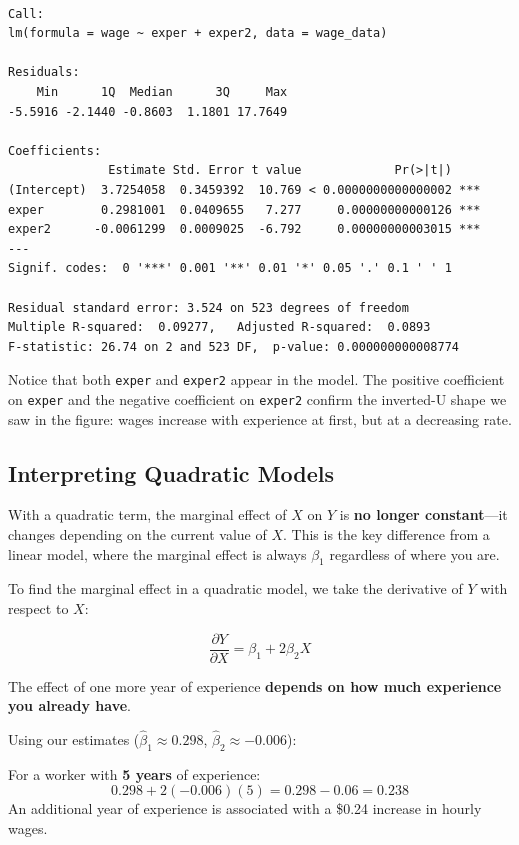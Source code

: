 \documentclass[
  letterpaper,
  DIV=11,
  numbers=noendperiod]{scrreprt}
\begin{document}
\begin{verbatim}

Call:
lm(formula = wage ~ exper + exper2, data = wage_data)

Residuals:
    Min      1Q  Median      3Q     Max 
-5.5916 -2.1440 -0.8603  1.1801 17.7649 

Coefficients:
              Estimate Std. Error t value             Pr(>|t|)    
(Intercept)  3.7254058  0.3459392  10.769 < 0.0000000000000002 ***
exper        0.2981001  0.0409655   7.277     0.00000000000126 ***
exper2      -0.0061299  0.0009025  -6.792     0.00000000003015 ***
---
Signif. codes:  0 '***' 0.001 '**' 0.01 '*' 0.05 '.' 0.1 ' ' 1

Residual standard error: 3.524 on 523 degrees of freedom
Multiple R-squared:  0.09277,   Adjusted R-squared:  0.0893 
F-statistic: 26.74 on 2 and 523 DF,  p-value: 0.000000000008774
\end{verbatim}

Notice that both \texttt{exper} and \texttt{exper2} appear in the model.
The positive coefficient on \texttt{exper} and the negative coefficient
on \texttt{exper2} confirm the inverted-U shape we saw in the figure:
wages increase with experience at first, but at a decreasing rate.

\subsection{Interpreting Quadratic
Models}\label{interpreting-quadratic-models}

With a quadratic term, the marginal effect of \(X\) on \(Y\) is
\textbf{no longer constant}---it changes depending on the current value
of \(X\). This is the key difference from a linear model, where the
marginal effect is always \(\beta_1\) regardless of where you are.

To find the marginal effect in a quadratic model, we take the derivative
of \(Y\) with respect to \(X\):

\[
\frac{\partial Y}{\partial X} = \beta_1 + 2\beta_2 X
\]

The effect of one more year of experience \textbf{depends on how much
experience you already have}.

Using our estimates (\(\hat{\beta}_1 \approx 0.298\),
\(\hat{\beta}_2 \approx -0.006\)):

For a worker with \textbf{5 years} of experience: \[
0.298 + 2(-0.006)(5) = 0.298 - 0.06 = 0.238
\] An additional year of experience is associated with a \$0.24 increase
in hourly wages.
\end{document}
